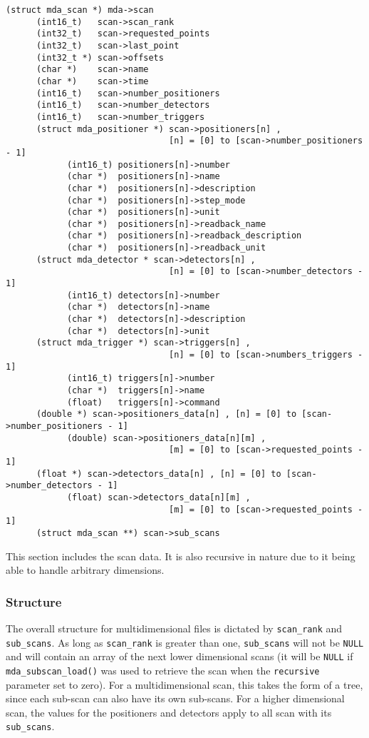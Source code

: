 \documentclass[10pt,letterpaper]{article}
\begin{document}
\begin{verbatim}
(struct mda_scan *) mda->scan
      (int16_t)   scan->scan_rank
      (int32_t)   scan->requested_points
      (int32_t)   scan->last_point
      (int32_t *) scan->offsets
      (char *)    scan->name
      (char *)    scan->time
      (int16_t)   scan->number_positioners
      (int16_t)   scan->number_detectors
      (int16_t)   scan->number_triggers
      (struct mda_positioner *) scan->positioners[n] , 
                                [n] = [0] to [scan->number_positioners - 1]
            (int16_t) positioners[n]->number
            (char *)  positioners[n]->name
            (char *)  positioners[n]->description
            (char *)  positioners[n]->step_mode
            (char *)  positioners[n]->unit
            (char *)  positioners[n]->readback_name
            (char *)  positioners[n]->readback_description
            (char *)  positioners[n]->readback_unit
      (struct mda_detector * scan->detectors[n] ,
                                [n] = [0] to [scan->number_detectors - 1]
            (int16_t) detectors[n]->number
            (char *)  detectors[n]->name
            (char *)  detectors[n]->description
            (char *)  detectors[n]->unit
      (struct mda_trigger *) scan->triggers[n] ,
                                [n] = [0] to [scan->numbers_triggers - 1]
            (int16_t) triggers[n]->number
            (char *)  triggers[n]->name
            (float)   triggers[n]->command
      (double *) scan->positioners_data[n] , [n] = [0] to [scan->number_positioners - 1]
            (double) scan->positioners_data[n][m] ,
                                [m] = [0] to [scan->requested_points - 1]
      (float *) scan->detectors_data[n] , [n] = [0] to [scan->number_detectors - 1]
            (float) scan->detectors_data[n][m] , 
                                [m] = [0] to [scan->requested_points - 1]
      (struct mda_scan **) scan->sub_scans
\end{verbatim}

This section includes the scan data.  It is also recursive in nature
due to it being able to handle arbitrary dimensions.  

\subsubsection{Structure}
\label{scanure}

The overall structure for multidimensional files is dictated by
\verb+scan_rank+ and \verb+sub_scans+.  As long as \verb+scan_rank+ is
greater than one, \verb+sub_scans+ will not be \verb+NULL+ and will
contain an array of the next lower dimensional scans (it will be
\verb+NULL+ if \verb+mda_subscan_load()+ was used to retrieve the scan
when the \verb+recursive+ parameter set to zero).  For a
multidimensional scan, this takes the form of a tree, since each
sub-scan can also have its own sub-scans.  For a higher dimensional
scan, the values for the positioners and detectors apply to all scan
with its \verb+sub_scans+.
\end{document}
